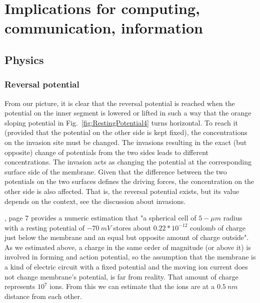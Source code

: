 

\section[Implications]{Implications for computing, communication, information\label{Physics-Implications}}


\subsection{Physics\label{sec:Physics-ImplicationsPhysics}}

\subsubsection{Reversal potential\label{sec:Physics-RestingReversal}}
From our picture, it is clear that the reversal potential is reached 
when the potential on the inner segment is lowered or lifted in such a way 
that the orange sloping potential in Fig.~\ref{fig:RestingPotential4} turns horizontal. To reach it (provided that
the potential on the other side is kept fixed), the concentrations on the
invasion site must be  changed. The invasions resulting in the exact (but opposite) change of potentials from the two sides leads to different concentrations.
The invasion acts as changing the potential at the corresponding surface side of the membrane. Given that the difference between the two potentials on the two surfaces defines the driving forces, the concentration on the other side is also affected.
That is, the reversal potential exists, but its value depends on the context, see the discussion about invasions.

 

\cite{KochBiophysics:1999}, page 7 provides a numeric estimation that "a spherical cell of $5-\mu m$ radius with a resting potential
of $-70\ mV$ stores about $0.22 * 10^{-12}$ coulomb of charge just below the membrane and
an equal but opposite amount of charge outside".
As we estimated above, a charge in the same order of magnitude (or above it)
is involved in forming and action potential, so the assumption that
the membrane is a kind of electric circuit with a fixed potential
and the moving ion current does not change membrane's potential,
is far from reality. That amount of charge represents $10^7$ ions.
From this we can estimate that the ions are at a $0.5\ nm$ distance from each other.

